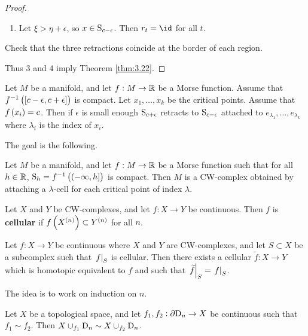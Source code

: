 \begin{proof}
\begin{enumerate}
\begin{enumerate}[leftmargin=0.5in, label=Case \arabic*.]
\item Let $ \xi > \eta + \epsilon $, so $ x \in \S_{c - \epsilon} $. Then $ r_t = \id $ for all $ t $.
\end{enumerate}
Check that the three retractions coincide at the border of each region.
\end{enumerate}
Thus $ 3 $ and $ 4 $ imply Theorem \ref{thm:3.22}.
\end{proof}

\begin{remark}
Let $ M $ be a manifold, and let $ f : M \to \RR $ be a Morse function. Assume that $ f^{-1}\br{\sbr{c - \epsilon, c + \epsilon}} $ is compact. Let $ x_1, \dots, x_k $ be the critical points. Assume that $ f\br{x_i} = c $. Then if $ \epsilon $ is small enough $ \S_{c + \epsilon} $ retracts to $ \S_{c - \epsilon} $ attached to $ e_{\lambda_1}, \dots, e_{\lambda_k} $ where $ \lambda_i $ is the index of $ x_i $.
\end{remark}


The goal is the following.

\begin{theorem}
\label{thm:4.12}
Let $ M $ be a manifold, and let $ f : M \to \RR $ be a Morse function such that for all $ h \in \RR $, $ \S_h = f^{-1}\br{\intoc{-\infty, h}} $ is compact. Then $ M $ is a CW-complex obtained by attaching a $ \lambda $-cell for each critical point of index $ \lambda $.
\end{theorem}

\pagebreak

\begin{definition}
Let $ X $ and $ Y $ be CW-complexes, and let $ f : X \to Y $ be continuous. Then $ f $ is \textbf{cellular} if $ f\br{X^{\br{n}}} \subset Y^{\br{n}} $ for all $ n $.
\end{definition}

\begin{theorem}
Let $ f : X \to Y $ be continuous where $ X $ and $ Y $ are CW-complexes, and let $ S \subset X $ be a subcomplex such that $ \eval{f}_S $ is cellular. Then there exists a cellular $ \widetilde{f} : X \to Y $ which is homotopic equivalent to $ f $ and such that $ \eval{\widetilde{f}}_S = \eval{f}_S $.
\end{theorem}

The idea is to work on induction on $ n $.

\begin{theorem}[Whitehead]
Let $ X $ be a topological space, and let $ f_1, f_2 : \da\D_n \to X $ be continuous such that $ f_1 \sim f_2 $. Then $ X \cup_{f_1} \D_n \sim X \cup_{f_2} \D_n $.
\end{theorem}


